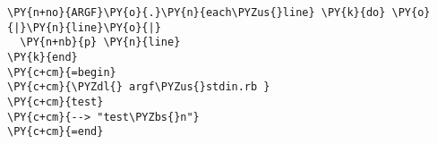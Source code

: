 \begin{Verbatim}[commandchars=\\\{\}]
\PY{n+no}{ARGF}\PY{o}{.}\PY{n}{each\PYZus{}line} \PY{k}{do} \PY{o}{|}\PY{n}{line}\PY{o}{|}
  \PY{n+nb}{p} \PY{n}{line}
\PY{k}{end}
\PY{c+cm}{=begin}
\PY{c+cm}{\PYZdl{} argf\PYZus{}stdin.rb }
\PY{c+cm}{test}
\PY{c+cm}{--> "test\PYZbs{}n"}
\PY{c+cm}{=end}
\end{Verbatim}
